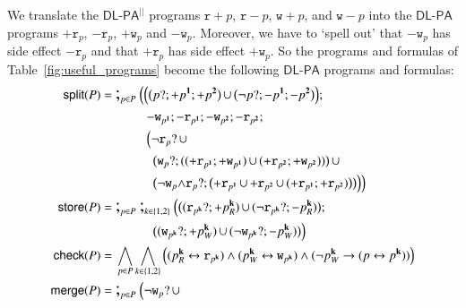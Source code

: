 \documentclass{llncs}
\newcommand{\progStore}{\mathsf{store}}
\newcommand{\progOkChange}{\mathsf{check}}
\newcommand{\progsplit}{\mathsf{split}}
\newcommand{\progmerge}{\mathsf{merge}}
\newcommand{\cp}[2]{{#2}^\mathbf{#1}}
\newcommand{\cpr}[2]{\cp{#1}{#2}_R}
\newcommand{\cpw}[2]{\cp{#1}{#2}_W}
\newcommand{\pll}{ {||} }							%
\newcommand{\readable}[1]{\mathtt{r}_{#1}}
\newcommand{\writable}[1]{\mathtt{w}_{#1}}
\newcommand{\testpdl}{?}				%
\newcommand{\Dlpa}{\ensuremath{\mathsf{DL\text{-}PA}}\xspace}
\newcommand{\DlpaPll}{\ensuremath{\mathsf{DL\text{-}PA}^\pll}\xspace}
\newcommand{\assgntop}[1]{{\mathtt {+} #1}}
\newcommand{\assgnbot}[1]{{\mathtt {-} #1}}
\newcommand{\assgntopR}[1]{{\mathtt r {+} #1}}
\newcommand{\assgnbotR}[1]{{\mathtt r {-} #1}}
\newcommand{\assgntopW}[1]{{\mathtt w {+} #1}}
\newcommand{\assgnbotW}[1]{{\mathtt w {-} #1}}
\newcommand{\assgntopV}[1]{{\mathtt {+} #1}}
\newcommand{\assgnbotV}[1]{{\mathtt {-} #1}}
\newcommand{\assgnpropV}[2]{(#1 \testpdl ; \assgntopV{#2}) \ndet (\lnot #1 \testpdl ; \assgnbotV{#2})}
\newcommand{\leqv}{ \leftrightarrow }
\newcommand{\limp}{ \rightarrow }
\newcommand{\ndet}{\,{\cup}\,}
\newcommand{\seqseq}[1]{ \text{\Large ;}_{#1} ~ }
\begin{document}
We translate the \DlpaPll programs
$\assgntopR{p}$, 
$\assgnbotR{p}$, 
$\assgntopW{p}$, and 
$\assgnbotW{p}$ 
into the \Dlpa programs 
$\assgntop{ \readable{p}}$,
$\assgnbot{ \readable{p}}$,
$\assgntop{ \writable{p}}$ and
$\assgnbot{ \writable{p}}$.
Moreover, we have to `spell out' that 
$\assgnbot{ \writable p }$ has side effect $\assgnbot{ \readable p }$ and that  
$\assgntop{ \readable p }$ has side effect $\assgntop{ \writable p }$. 
So the programs and formulas of Table~\ref{fig:useful_programs} become the following \Dlpa programs and formulas:
\begin{align*}
\progsplit(P) =&\ \seqseq{p \in P} \Big( 
\Big(
  \big( p \testpdl ; \assgntopV{ \cp{1}{p} } ; \assgntopV{ \cp{2}{p} } \big) \ndet 
  \big( \lnot p \testpdl ; \assgnbotV{ \cp{1}{p} } ; \assgnbotV{ \cp{2}{p} } \big) 
\Big) ;
\\& ~~~~~~~~~~~
\assgnbot{ \writable{\cp 1 {p}}} ; \assgnbot{ \readable{\cp 1 {p}}} ; \assgnbot{ \writable{\cp 2 {p}}} ; \assgnbot{ \readable{\cp 2 {p}}} ;
\\& ~~~~~~~~~~~
\Big(
  \lnot \readable p  \testpdl \ndet 
  \\& ~~~~~~~~~~~~~
  \big(\writable{p} \testpdl ; ( (\assgntop{ \readable{\cp 1 {p}}} ; \assgntop{ \writable{\cp 1 {p}}}) \ndet (\assgntop{ \readable{\cp 2 {p}}} ; \assgntop{ \writable{\cp 2 {p}}}) ) \big) 			 \ndet
  \\& ~~~~~~~~~~~~~
  \big(\lnot \writable{p} {\land} \readable p  \testpdl ; \big( \assgntop{ \readable{\cp 1 {p}}} \ndet \assgntop{ \readable{\cp 2 {p}}} \ndet 
(\assgntop{ \readable{\cp 1 {p}}}  ; \assgntop{ \readable{\cp 2 {p}}}) \big) \big) 
\Big)
\Big)
\\ %
\progStore(P) =&\ \seqseq{p \in P} \seqseq{k \in \{1, 2\}} \Big(
  \big( \assgnpropV{\readable{\cp k p}}{\cpr k p} \big) ;
  \\& ~~~~~~~~~~~~~
  \big( \assgnpropV{\writable{\cp k p}}{\cpw k p} \big)
\Big)
\\ %
\progOkChange(P) =&\ \bigwedge_{p \in P} \bigwedge_{k \in \{1, 2\}} \Big(
( \cpr k p \leqv \readable{ \cp k {p} } ) 	\land 
( \cpw k p \leqv \writable{ \cp k {p} } ) 	\land 	
( \lnot \cpw k {p} \limp (p \leqv \cp k {p}) )
\Big)
\\ %
\progmerge(P) =&\ \seqseq{p \in P} \Big(
\lnot \writable{p} \testpdl \ndet 
\\& ~~~~~~~~~~~ 

\end{align*}
\end{document}
